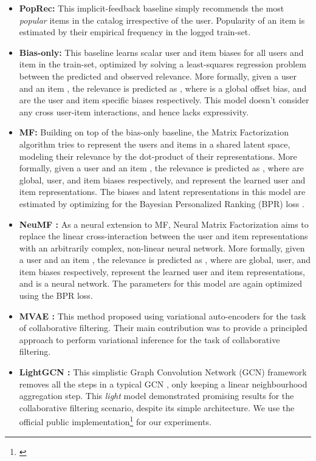 \documentclass{article}
\begin{document}
\begin{itemize}[leftmargin=.3in]
    \item \textbf{PopRec:} This implicit-feedback baseline simply recommends the most \emph{popular} items in the catalog irrespective of the user. Popularity of an item is estimated by their empirical frequency in the logged train-set.
    
    \item \textbf{Bias-only:} This baseline learns scalar user and item biases for all users and item in the train-set, optimized by solving a least-squares regression problem between the predicted and observed relevance. More formally, given a user  and an item , the relevance is predicted as , where  is a global offset bias, and  are the user and item specific biases respectively. This model doesn't consider any cross user-item interactions, and hence lacks expressivity.
    
    \item \textbf{MF:} Building on top of the bias-only baseline, the Matrix Factorization algorithm tries to represent the users and items in a shared latent space, modeling their relevance by the dot-product of their representations. More formally, given a user  and an item , the relevance is predicted as , where  are global, user, and item biases respectively, and  represent the learned user and item representations. The biases and latent representations in this model are estimated by optimizing for the Bayesian Personalized Ranking (BPR) loss \cite{bpr}.
    
    \item \textbf{NeuMF \cite{neural_mf}:} As a neural extension to MF, Neural Matrix Factorization aims to replace the linear cross-interaction between the user and item representations with an arbitrarily complex, non-linear neural network. More formally, given a user  and an item , the relevance is predicted as , where  are global, user, and item biases respectively,  represent the learned user and item representations, and  is a neural network. The parameters for this model are again optimized using the BPR loss.
    
    \item \textbf{MVAE \cite{mvae}:} This method proposed using variational auto-encoders for the task of collaborative filtering. Their main contribution was to provide a principled approach to perform variational inference for the task of collaborative filtering. 
    
    \item \textbf{LightGCN \cite{light_gcn}:} This simplistic Graph Convolution Network (GCN) framework removes all the steps in a typical GCN \cite{gcn}, only keeping a linear neighbourhood aggregation step. This \emph{light} model demonstrated promising results for the collaborative filtering scenario, despite its simple architecture. We use the official public implementation\footnote{\href{https://github.com/gusye1234/LightGCN-PyTorch}{\color{blue}{https://github.com/gusye1234/LightGCN-PyTorch}}} for our experiments.
    

\end{itemize}
\end{document}
